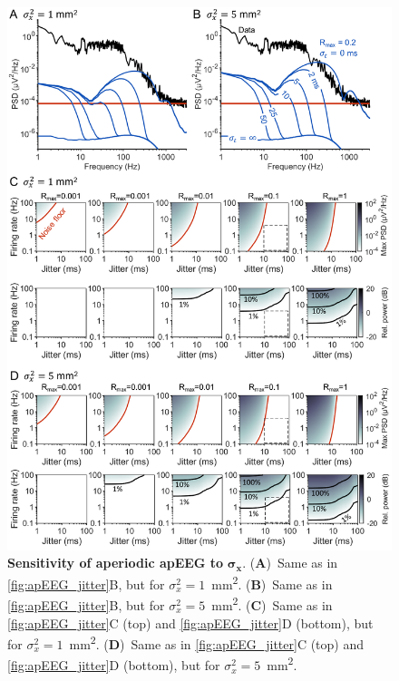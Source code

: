 \begin{figure}[h!]
    \centering
    \includegraphics[width=13.2cm]{Figures/chapter3/figureS5.png}
    \caption[Sensitivity of aperiodic apEEG to $\sigma_x$]{\textbf{Sensitivity of aperiodic apEEG to }$\bm{\sigma_x}$. (\textbf{A})~Same as in {\autoref{fig:apEEG_jitter}B}, but for $\sigma^2_x=1$~\unit{\milli\meter^2}. (\textbf{B})~Same as in {\autoref{fig:apEEG_jitter}B}, but for $\sigma^2_x=5$~\unit{\milli\meter^2}. (\textbf{C})~Same as in {\autoref{fig:apEEG_jitter}C} (top) and {\autoref{fig:apEEG_jitter}D} (bottom), but for $\sigma^2_x=1$~\unit{\milli\meter^2}. (\textbf{D})~Same as in {\autoref{fig:apEEG_jitter}C} (top) and {\autoref{fig:apEEG_jitter}D} (bottom), but for $\sigma^2_x=5$~\unit{\milli\meter^2}.} 
    \label{fig:jitter_sigx}
\end{figure}

\clearpage

